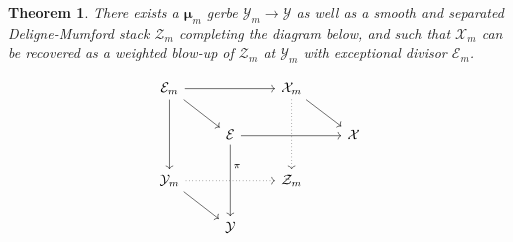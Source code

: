\documentclass{amsart}
\newcommand{\cE}{\mathcal{E}}
\newcommand{\cX}{\mathcal{X}}
\newcommand{\cY}{\mathcal{Y}}
\newcommand{\cZ}{\mathcal{Z}}
\newcommand{\bmu}{\bm{\mu}}
\newtheorem{Teo}[theorem]{Theorem}
\theoremstyle{definition}
\begin{document}
\begin{Teo}\label{thm_appendix}
There exists a $\bmu_m$ gerbe $\cY_m\to \cY$ as well as a smooth and separated Deligne-Mumford stack $\cZ_m$ completing the diagram below, and such that $\cX_m$ can be recovered as a weighted blow-up of $\cZ_m$ at $\cY_m$ with exceptional divisor $\cE_m$.
\end{Teo}
$$\begin{tikzcd}
\cE_m \arrow[rr,""] \arrow[dr] \arrow[dd,""] &&  \cX_m \arrow[dr] \arrow[dd,dotted,"",pos=0.3] \\
&\cE \arrow[rr,"",pos=0.3] \arrow[dd,"\pi",pos=0.3] && \cX  \\
\cY_m \arrow[dr] \arrow[rr,dotted,"",pos=0.3] && \cZ_m\\
& \cY 
\end{tikzcd}$$
\end{document}
